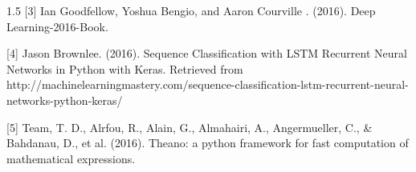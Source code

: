 \documentclass[10pt,a4paper]{article}
\begin{document}
\begin{spacing}{1.5}
		[3] Ian Goodfellow, Yoshua Bengio, and Aaron Courville . (2016). Deep Learning-2016-Book.
		
		[4] Jason Brownlee. (2016). Sequence Classification with LSTM Recurrent Neural Networks in Python with Keras. Retrieved from http://machinelearningmastery.com/sequence-classification-lstm-recurrent-neural-networks-python-keras/
		
		[5] Team, T. D., Alrfou, R., Alain, G., Almahairi, A., Angermueller, C., \& Bahdanau, D., et al. (2016). Theano: a python framework for fast computation of mathematical expressions.
		
		
	\end{spacing}
\end{document}
